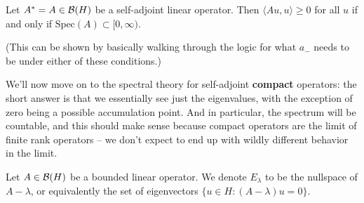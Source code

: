 \begin{corollary}
Let $A^\ast = A \in \mathcal{B}(H)$ be a self-adjoint linear operator. Then $\langle Au, u \rangle \ge 0$ for all $u$ if and only if $\text{Spec}(A) \subset [0, \infty)$.
\end{corollary}

(This can be shown by basically walking through the logic for what $a_-$ needs to be under either of these conditions.)

We'll now move on to the spectral theory for self-adjoint \textbf{compact} operators: the short answer is that we essentially see just the eigenvalues, with the exception of zero being a possible accumulation point. And in particular, the spectrum will be countable, and this should make sense because compact operators are the limit of finite rank operators -- we don't expect to end up with wildly different behavior in the limit.

\begin{definition}
Let $A \in \mathcal{B}(H)$ be a bounded linear operator. We denote $E_\lambda$ to be the nullspace of $A - \lambda$, or equivalently the set of eigenvectors $\{u \in H: (A-\lambda)u = 0\}$.
\end{definition}

